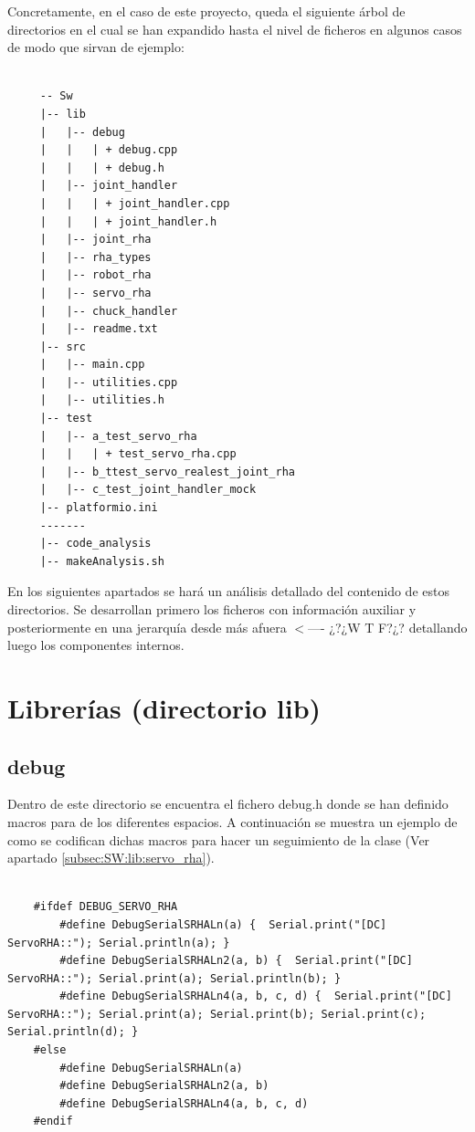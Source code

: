    Concretamente, en el caso de este proyecto, queda el siguiente árbol de directorios en el cual se han expandido hasta el nivel de ficheros en algunos casos de modo que sirvan de ejemplo:

    \lstset{language=C, breaklines=true, basicstyle=\footnotesize}
        \begin{lstlisting}[frame=single]

     -- Sw
     |-- lib
     |   |-- debug
     |   |   | + debug.cpp
     |   |   | + debug.h
     |   |-- joint_handler
     |   |   | + joint_handler.cpp
     |   |   | + joint_handler.h
     |   |-- joint_rha
     |   |-- rha_types
     |   |-- robot_rha
     |   |-- servo_rha
     |   |-- chuck_handler
     |   |-- readme.txt
     |-- src
     |   |-- main.cpp
     |   |-- utilities.cpp
     |   |-- utilities.h
     |-- test
     |   |-- a_test_servo_rha
     |   |   | + test_servo_rha.cpp
     |   |-- b_ttest_servo_realest_joint_rha
     |   |-- c_test_joint_handler_mock
     |-- platformio.ini
     -------
     |-- code_analysis
     |-- makeAnalysis.sh
        \end{lstlisting}

    En los siguientes apartados se hará un análisis detallado del contenido de estos directorios. Se desarrollan primero los ficheros con información auxiliar y posteriormente en una jerarquía desde más afuera \textcolor{pRojo}{$<$---- ¿?¿W T F?¿?} detallando luego los componentes internos.
\section{Librerías (directorio lib)} \label{sec:SW:lib}

    \subsection{debug} \label{subsec:SW:lib:debug}
        Dentro de este directorio se encuentra el fichero debug.h donde se han definido macros para  de los diferentes espacios. A continuación se muestra un ejemplo de como se codifican dichas macros para hacer un seguimiento de la clase  (Ver apartado \ref{subsec:SW:lib:servo_rha}).

        \lstset{language=C, breaklines=true, basicstyle=\footnotesize}
        \begin{lstlisting}[frame=single]

    #ifdef DEBUG_SERVO_RHA
        #define DebugSerialSRHALn(a) {  Serial.print("[DC]  ServoRHA::"); Serial.println(a); }
        #define DebugSerialSRHALn2(a, b) {  Serial.print("[DC]  ServoRHA::"); Serial.print(a); Serial.println(b); }
        #define DebugSerialSRHALn4(a, b, c, d) {  Serial.print("[DC]  ServoRHA::"); Serial.print(a); Serial.print(b); Serial.print(c); Serial.println(d); }
    #else
        #define DebugSerialSRHALn(a)
        #define DebugSerialSRHALn2(a, b)
        #define DebugSerialSRHALn4(a, b, c, d)
    #endif

        \end{lstlisting}


